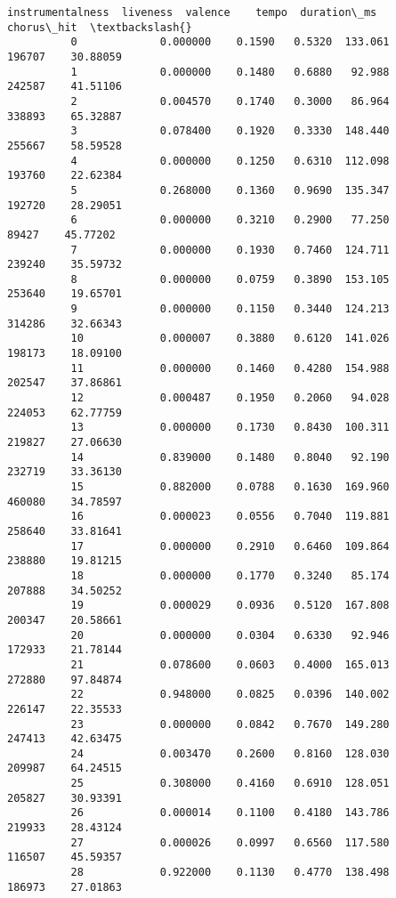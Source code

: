 \documentclass[11pt]{article}
\begin{document}
\begin{Verbatim}[commandchars=\\\{\}]
                instrumentalness  liveness  valence    tempo  duration\_ms  chorus\_hit  \textbackslash{}
          0             0.000000    0.1590   0.5320  133.061       196707    30.88059   
          1             0.000000    0.1480   0.6880   92.988       242587    41.51106   
          2             0.004570    0.1740   0.3000   86.964       338893    65.32887   
          3             0.078400    0.1920   0.3330  148.440       255667    58.59528   
          4             0.000000    0.1250   0.6310  112.098       193760    22.62384   
          5             0.268000    0.1360   0.9690  135.347       192720    28.29051   
          6             0.000000    0.3210   0.2900   77.250        89427    45.77202   
          7             0.000000    0.1930   0.7460  124.711       239240    35.59732   
          8             0.000000    0.0759   0.3890  153.105       253640    19.65701   
          9             0.000000    0.1150   0.3440  124.213       314286    32.66343   
          10            0.000007    0.3880   0.6120  141.026       198173    18.09100   
          11            0.000000    0.1460   0.4280  154.988       202547    37.86861   
          12            0.000487    0.1950   0.2060   94.028       224053    62.77759   
          13            0.000000    0.1730   0.8430  100.311       219827    27.06630   
          14            0.839000    0.1480   0.8040   92.190       232719    33.36130   
          15            0.882000    0.0788   0.1630  169.960       460080    34.78597   
          16            0.000023    0.0556   0.7040  119.881       258640    33.81641   
          17            0.000000    0.2910   0.6460  109.864       238880    19.81215   
          18            0.000000    0.1770   0.3240   85.174       207888    34.50252   
          19            0.000029    0.0936   0.5120  167.808       200347    20.58661   
          20            0.000000    0.0304   0.6330   92.946       172933    21.78144   
          21            0.078600    0.0603   0.4000  165.013       272880    97.84874   
          22            0.948000    0.0825   0.0396  140.002       226147    22.35533   
          23            0.000000    0.0842   0.7670  149.280       247413    42.63475   
          24            0.003470    0.2600   0.8160  128.030       209987    64.24515   
          25            0.308000    0.4160   0.6910  128.051       205827    30.93391   
          26            0.000014    0.1100   0.4180  143.786       219933    28.43124   
          27            0.000026    0.0997   0.6560  117.580       116507    45.59357   
          28            0.922000    0.1130   0.4770  138.498       186973    27.01863   

\end{Verbatim}
\end{document}
